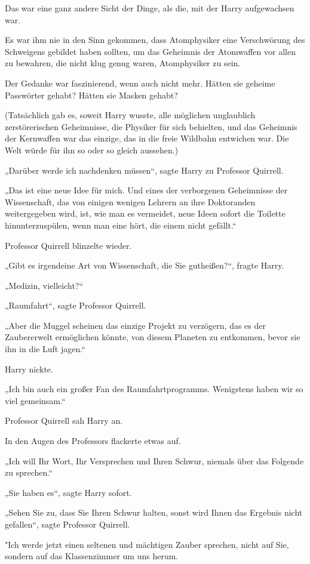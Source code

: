 {Das war eine ganz andere Sicht der Dinge, als die, mit der Harry aufgewachsen war.

Es war ihm nie in den Sinn gekommen, dass Atomphysiker eine Verschwörung des Schweigens gebildet haben sollten, um das Geheimnis der Atomwaffen vor allen zu bewahren, die nicht klug genug waren, Atomphysiker zu sein.

Der Gedanke war faszinierend, wenn auch nicht mehr. Hätten sie geheime Passwörter gehabt? Hätten sie Masken gehabt?

(Tatsächlich gab es, soweit Harry wusste, alle möglichen unglaublich zerstörerischen Geheimnisse, die Physiker für sich behielten, und das Geheimnis der Kernwaffen war das einzige, das in die freie Wildbahn entwichen war. Die Welt würde für ihn so oder so gleich aussehen.)

„Darüber werde ich nachdenken müssen“, sagte Harry zu Professor Quirrell.

„Das ist eine neue Idee für mich. Und eines der verborgenen Geheimnisse der Wissenschaft, das von einigen wenigen Lehrern an ihre Doktoranden weitergegeben wird, ist, wie man es vermeidet, neue Ideen sofort die Toilette hinunterzuspülen, wenn man eine hört, die einem nicht gefällt.“

Professor Quirrell blinzelte wieder.

„Gibt es irgendeine Art von Wissenschaft, die Sie gutheißen?“, fragte Harry.

„Medizin, vielleicht?“

„Raumfahrt“, sagte Professor Quirrell.

„Aber die Muggel scheinen das einzige Projekt zu verzögern, das es der Zaubererwelt ermöglichen könnte, von diesem Planeten zu entkommen, bevor sie ihn in die Luft jagen.“

Harry nickte.

„Ich bin auch ein großer Fan des Raumfahrtprogramms. Wenigstens haben wir so viel gemeinsam.“

Professor Quirrell sah Harry an.

In den Augen des Professors flackerte etwas auf.

„Ich will Ihr Wort, Ihr Versprechen und Ihren Schwur, niemals über das Folgende zu sprechen.“

„Sie haben es“, sagte Harry sofort.

„Sehen Sie zu, dass Sie Ihren Schwur halten, sonst wird Ihnen das Ergebnis nicht gefallen“, sagte Professor Quirrell.

"Ich werde jetzt einen seltenen und mächtigen Zauber sprechen, nicht auf Sie, sondern auf das Klassenzimmer um uns herum.

}
